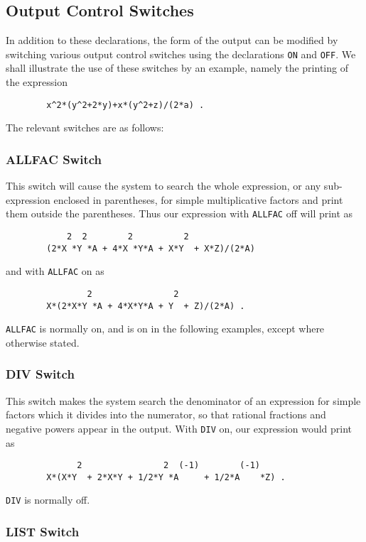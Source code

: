 \subsection{Output Control Switches}
\label{sec-output}
In addition to these declarations, the form of the output can be modified
by switching various output control switches using the declarations
{\tt ON} and {\tt OFF}.  We shall illustrate the use of these switches by an
example, namely the printing of the expression
\begin{verbatim}
        x^2*(y^2+2*y)+x*(y^2+z)/(2*a) .
\end{verbatim}
The relevant switches are as follows:

\subsubsection{ALLFAC Switch}

This switch will cause the system to search the whole expression, or any
sub-expression enclosed in parentheses, for simple multiplicative factors
and print them outside the parentheses. Thus our expression with {\tt ALLFAC}
off will print as
\begin{verbatim}
            2  2        2          2
        (2*X *Y *A + 4*X *Y*A + X*Y  + X*Z)/(2*A)
\end{verbatim}
and with {\tt ALLFAC} on as
\begin{verbatim}
                2                2
        X*(2*X*Y *A + 4*X*Y*A + Y  + Z)/(2*A) .
\end{verbatim}
{\tt ALLFAC} is normally on, and is on in the following examples, except
where otherwise stated.

\subsubsection{DIV Switch}

This switch makes the system search the denominator of an expression for
simple factors which it divides into the numerator, so that rational
fractions and negative powers appear in the output. With {\tt DIV} on, our
expression would print as
\begin{verbatim}
              2                2  (-1)        (-1)
        X*(X*Y  + 2*X*Y + 1/2*Y *A     + 1/2*A    *Z) .
\end{verbatim}
{\tt DIV} is normally off.

\subsubsection{LIST Switch}

